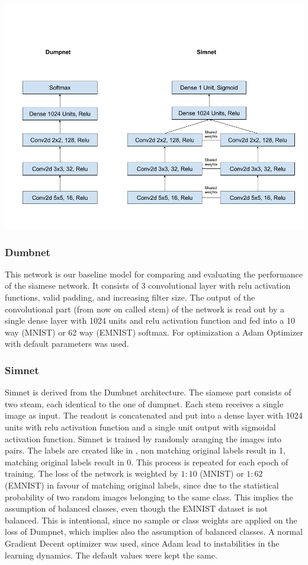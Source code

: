 \documentclass[a4paper,pt12]{article}
\begin{document}
\includegraphics[scale=0.3]{nets.png}

\subsubsection{Dumbnet}
This network is our baseline model for comparing and evaluating the performance of the siamese network.  It consists of 3 convolutional layer with relu activation functions, valid padding, and increasing filter size. \newline
The output of the convolutional part (from now on called stem) of the network is read out by a single dense layer with 1024 units and relu activation function and fed into a 10 way (MNIST) or 62 way (EMNIST) softmax. For optimization a Adam Optimizer with default parameters was used.

\subsubsection{Simnet}
Simnet is derived from the Dumbnet architecture. The siamese part consists of two steam, each identical to the one of dumpnet. Each stem receives a single image as input. The readout is concatenated and put into a dense layer with 1024 units with relu activation function and a single unit output with sigmoidal activation function. \newline
Simnet is trained by randomly aranging the images into pairs. The labels are created like in \cite{siamese}, non matching original labels result in 1, matching original labels result in 0. This process is repeated for each epoch of training. \newline
The loss of the network is weighted by $1:10$ (MNIST) or $1:62$ (EMNIST) in favour of matching original labels, since due to the statistical probability of two random images belonging to the same class. This implies the assumption of balanced classes, even though the EMNIST dataset is not balanced. This is intentional, since no sample or class weights are applied on the loss of Dumpnet, which implies also the assumption of balanced classes. \newline
A normal Gradient Decent optimizer was used, since Adam lead to instabilities in the learning dynamics. The default values were kept the same.
\end{document}
